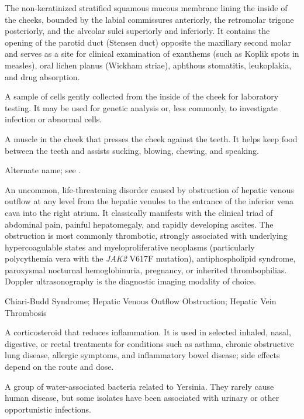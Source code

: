  The non-keratinized stratified squamous mucous membrane lining the inside of the cheeks, bounded by the labial commissures anteriorly, the retromolar trigone posteriorly, and the alveolar sulci superiorly and inferiorly. It contains the opening of the parotid duct (Stensen duct) opposite the maxillary second molar and serves as a site for clinical examination of exanthems (such as Koplik spots in measles), oral lichen planus (Wickham striae), aphthous stomatitis, leukoplakia, and drug absorption.

 A sample of cells gently collected from the inside of the cheek for laboratory testing. It may be used for genetic analysis or, less commonly, to investigate infection or abnormal cells.

 A muscle in the cheek that presses the cheek against the teeth. It helps keep food between the teeth and assists sucking, blowing, chewing, and speaking.

 Alternate name; see .

 An uncommon, life-threatening disorder caused by obstruction of hepatic venous outflow at any level from the hepatic venules to the entrance of the inferior vena cava into the right atrium. It classically manifests with the clinical triad of abdominal pain, painful hepatomegaly, and rapidly developing ascites. The obstruction is most commonly thrombotic, strongly associated with underlying hypercoagulable states and myeloproliferative neoplasms (particularly polycythemia vera with the \textit{JAK2} V617F mutation), antiphospholipid syndrome, paroxysmal nocturnal hemoglobinuria, pregnancy, or inherited thrombophilias. Doppler ultrasonography is the diagnostic imaging modality of choice.

\synonyms
Chiari-Budd Syndrome; Hepatic Venous Outflow Obstruction; Hepatic Vein Thrombosis

 A corticosteroid that reduces inflammation. It is used in selected inhaled, nasal, digestive, or rectal treatments for conditions such as asthma, chronic obstructive lung disease, allergic symptoms, and inflammatory bowel disease; side effects depend on the route and dose.

 A group of water-associated bacteria related to Yersinia. They rarely cause human disease, but some isolates have been associated with urinary or other opportunistic infections.

